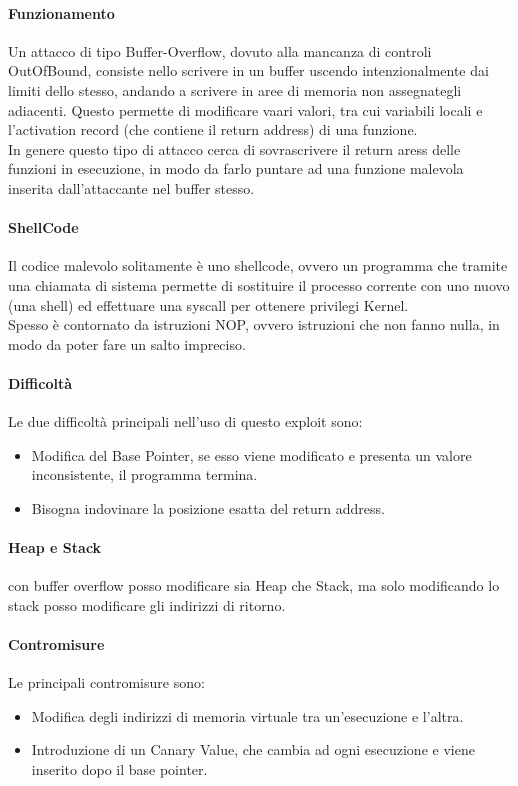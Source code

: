 \documentclass[12pt, a4paper, openany]{book}
\begin{document}
\paragraph*{Funzionamento}
Un attacco di tipo Buffer-Overflow, dovuto alla mancanza di controli OutOfBound, consiste nello scrivere in un buffer uscendo intenzionalmente dai limiti dello stesso, andando a scrivere in aree di memoria non assegnategli adiacenti.
Questo permette di modificare vaari valori, tra cui variabili locali e l'activation record (che contiene il return address) di una funzione.
\\In genere questo tipo di attacco cerca di sovrascrivere il return aress delle funzioni in esecuzione, in modo da farlo puntare ad una funzione malevola inserita dall'attaccante nel buffer stesso.

\paragraph*{ShellCode} 
Il codice malevolo solitamente è uno shellcode, ovvero un programma che tramite una chiamata di sistema permette di sostituire il processo corrente con uno nuovo (una shell) ed effettuare una syscall per ottenere privilegi Kernel.
\\Spesso è contornato da istruzioni NOP, ovvero istruzioni che non fanno nulla, in modo da poter fare un salto impreciso.

\paragraph*{Difficoltà} Le due difficoltà principali nell'uso di questo exploit sono:
\begin{itemize}
    \item Modifica del Base Pointer, se esso viene modificato e presenta un valore inconsistente, il programma termina.
    \item Bisogna indovinare la posizione esatta del return address.
\end{itemize}
\paragraph*{Heap e Stack} con buffer overflow posso modificare sia Heap che Stack, ma solo modificando lo stack posso modificare gli indirizzi di ritorno. 
\paragraph*{Contromisure}
Le principali contromisure sono:
\begin{itemize}
    \item Modifica degli indirizzi di memoria virtuale tra un'esecuzione e l'altra.
    \item Introduzione di un Canary Value, che cambia ad ogni esecuzione e viene inserito dopo il base pointer.
\end{itemize}
\end{document}
